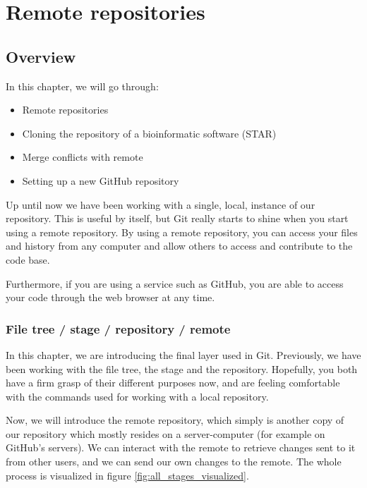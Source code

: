 \documentclass[../main/git_course_main.tex]{subfiles}
\begin{document}
\setcounter{chapter}{4}
\chapter{Remote repositories}


\section{Overview}

In this chapter, we will go through:

\begin{itemize}
	\item Remote repositories
	\item Cloning the repository of a bioinformatic software (STAR)
	\item Merge conflicts with remote
	\item Setting up a new GitHub repository
\end{itemize}

Up until now we have been working with a single, local, instance of our
repository. This is useful by itself, but Git really starts to shine
when you start using a remote repository. By using a remote repository, you can access
your files and history from any computer and allow others to access and contribute to the code base.

Furthermore, if you are using a service such as GitHub, you are able to access your code through the web browser at any time.

\subsection{File tree / stage / repository / remote}

In this chapter, we are introducing the final layer used in Git.
Previously, we have been working with the file tree, the stage and the repository.
Hopefully, you both have a firm grasp of their different purposes now, and are feeling comfortable with the commands used for working with a local repository.

Now, we will introduce the remote repository, which simply is another copy of our
repository which mostly resides on a server-computer (for example on GitHub's servers).
We can interact with the remote to retrieve changes sent to it from other users,
and we can send our own changes to the remote. The whole process is visualized in figure \ref{fig:all_stages_visualized}.
\end{document}
